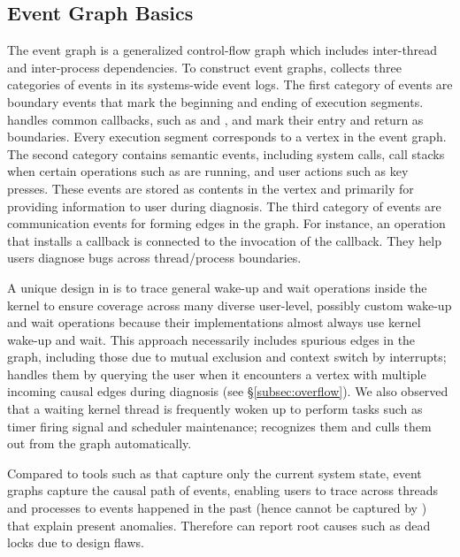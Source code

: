 \subsection{Event Graph Basics}\label{subsec:eventgraph}

The event graph is a generalized control-flow graph which includes inter-thread
and inter-process dependencies. To construct event graphs, \xxx collects three
categories of events in its systems-wide event logs. The first category of
events are boundary events that mark the beginning and ending of execution
segments. \xxx handles common callbacks, such as 
and , and mark their entry and return as boundaries.
Every execution segment corresponds to a vertex in the event graph. The second
category contains semantic events, including system calls, call stacks when
certain operations such as  are running, and user actions such as
key presses. These events are stored as contents in the vertex and primarily for
providing information to user during diagnosis. The third category of events are
communication events for forming edges in the graph. For instance, an operation
that installs a callback is connected to the invocation of the callback. They
help users diagnose bugs across thread/process boundaries.


A unique design in \xxx is to trace general wake-up and wait operations inside
the kernel to ensure coverage across many diverse user-level, possibly custom
wake-up and wait operations because their implementations almost always use
kernel wake-up and wait. This approach necessarily includes spurious edges
in the graph, including those due to mutual exclusion and context switch by
interrupts; \xxx handles them by querying the user when it encounters a vertex
with multiple incoming causal edges during diagnosis (see \S\ref{subsec:overflow}).
We also observed that a waiting kernel thread is frequently woken up to perform
tasks such as timer firing signal and scheduler maintenance; \xxx recognizes
them and culls them out from the graph automatically.

Compared to tools such as \spindump that capture only the current system state,
event graphs capture the causal path of events, enabling users to trace across
threads and processes to events happened in the past (hence cannot be captured by
\spindump) that explain present anomalies. Therefore \xxx can report
root causes such as dead locks due to design flaws.

